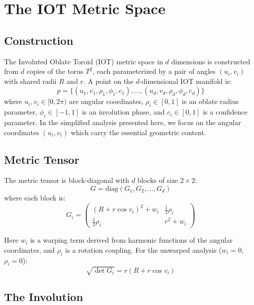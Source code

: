\section{The IOT Metric Space}
\label{sec:iot_metric}

\subsection{Construction}

The Involuted Oblate Toroid (IOT) metric space in $d$ dimensions is constructed from $d$ copies of the torus $T^2$, each parameterized by a pair of angles $(u_i, v_i)$ with shared radii $R$ and $r$. A point on the $d$-dimensional IOT manifold is:
\begin{equation}
    p = \{(u_1, v_1, \rho_1, \phi_1, c_1), \ldots, (u_d, v_d, \rho_d, \phi_d, c_d)\}
\end{equation}
where $u_i, v_i \in [0, 2\pi)$ are angular coordinates, $\rho_i \in [0,1]$ is an oblate radius parameter, $\phi_i \in [-1,1]$ is an involution phase, and $c_i \in [0,1]$ is a confidence parameter. In the simplified analysis presented here, we focus on the angular coordinates $(u_i, v_i)$ which carry the essential geometric content.

\subsection{Metric Tensor}

The metric tensor is block-diagonal with $d$ blocks of size $2 \times 2$:
\begin{equation}
    G = \text{diag}(G_1, G_2, \ldots, G_d)
\end{equation}
where each block is:
\begin{equation}
    G_i = \begin{pmatrix}
        (R + r\cos v_i)^2 + w_i & \frac{1}{2}\rho_i \\
        \frac{1}{2}\rho_i & r^2 + w_i
    \end{pmatrix}
    \label{eq:metric_block}
\end{equation}

Here $w_i$ is a warping term derived from harmonic functions of the angular coordinates, and $\rho_i$ is a rotation coupling. For the unwarped analysis ($w_i = 0$, $\rho_i = 0$):
\begin{equation}
    \sqrt{\det G_i} = r(R + r\cos v_i)
\end{equation}

\subsection{The Involution}

